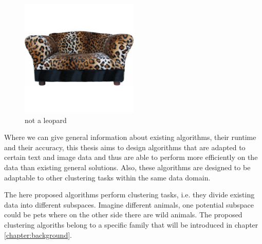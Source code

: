 \begin{figure}[h]
    \centering
    \includegraphics[width=0.5\textwidth]{images/sofa}
    \caption{not a leopard}
    \label{fig:couch}
\end{figure}

Where we can give general information about existing algorithms, their runtime and their accuracy, this thesis aims to design algorithms that are adapted to certain text and image data and thus are able to perform more efficiently on the data than existing general solutions. Also, these algorithms are designed to be adaptable to other clustering tasks within the same data domain.

The here proposed algorithms perform clustering tasks, i.e. they divide existing data into different subspaces. Imagine different animals, one potential subspace could be pets where on the other side there are wild animals. The proposed clustering algoriths belong to a specific family that will be introduced in chapter \ref{chapter:background}.